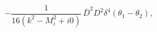 \begin{equation}
- \frac{1}{16(k^2-M_i^2+i0)}\, \bar D^2 D^2 \delta^4(\theta_1-\theta_2),
\end{equation}

